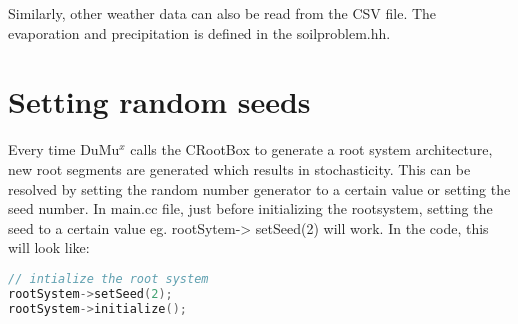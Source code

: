 Similarly, other weather data can also be read from the CSV file. The evaporation and precipitation is defined in the soilproblem.hh.

\section*{Setting random seeds}

Every time DuMu$^x$ calls the CRootBox to generate a root system architecture, new root segments are generated which results in stochasticity. This can be resolved by setting the random number generator to a certain value or setting the seed number. In main.cc file, just before initializing the rootsystem, setting the seed to a certain value eg. rootSytem-> setSeed(2) will work. In the code, this will look like:

\begin{lstlisting}[language=C++, caption={Setting random number generator}]
// intialize the root system
rootSystem->setSeed(2);
rootSystem->initialize();
\end{lstlisting} 